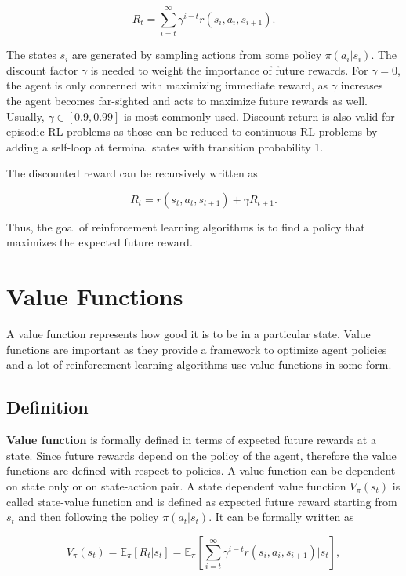\begin{equation}\label{eq:discreward}
R_t = \sum_{i=t}^\infty \gamma^{i-t}r(s_i, a_i, s_{i+1}).
\end{equation}

The states $s_i$ are generated by sampling actions from some policy $\pi(a_i|s_i)$. The discount factor $\gamma$ is needed to weight the importance of future rewards. For $\gamma=0$, the agent is only concerned with maximizing immediate reward, as $\gamma$ increases the agent becomes far-sighted and acts to maximize future rewards as well. Usually, $\gamma \in [0.9, 0.99]$ is most commonly used. Discount return is also valid for episodic RL problems as those can be reduced to continuous RL problems by adding a self-loop at terminal states with transition probability 1. 

The discounted reward can be recursively written as 

\begin{equation}\label{eq:recdiscreward}
R_t = r(s_t, a_t, s_{t+1}) + \gamma R_{t+1}.
\end{equation}

Thus, the goal of reinforcement learning algorithms is to find a policy that maximizes the expected future reward.

\section{Value Functions}
A value function represents how good it is to be in a particular state. Value functions are important as they provide a framework to optimize agent policies and a lot of reinforcement learning algorithms use value functions in some form. 

\subsection{Definition}

\textbf{Value function} is formally defined in terms of expected future rewards at a state. Since future rewards depend on the policy of the agent, therefore the value functions are defined with respect to policies. A value function can be dependent on state only or on state-action pair. A state dependent value function $V_\pi(s_t)$ is called state-value function and is defined as expected future reward starting from $s_t$ and then following the policy $\pi(a_t|s_t)$. It can be formally written as

\begin{equation}
\label{eq:vfunction}
V_\pi(s_t) = \mathbb{E}_\pi[R_t|s_t] = \mathbb{E}_\pi\left[\sum_{i=t}^\infty \gamma^{i-t}r(s_i, a_i, s_{i+1})|s_t\right],
\end{equation}

